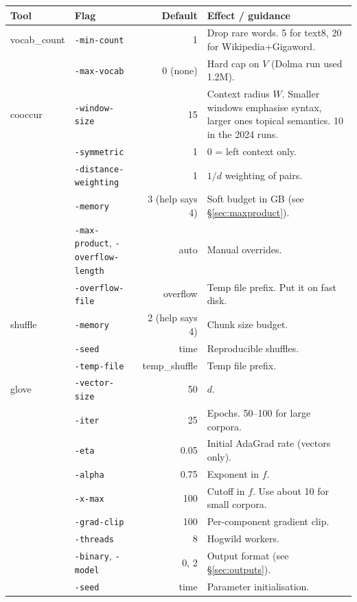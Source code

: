 \documentclass[11pt,a4paper]{article}
\newcommand{\opt}[1]{\texttt{-#1}}
\begin{document}
\begin{center}
\small
\begin{tabularx}{\linewidth}{llrX}
\toprule
Tool & Flag & Default & Effect / guidance \\
\midrule
vocab\_count & \opt{min-count} & 1 & Drop rare words. 5 for text8, 20 for Wikipedia+Gigaword. \\
             & \opt{max-vocab} & 0 (none) & Hard cap on $V$ (Dolma run used 1.2M). \\
\midrule
cooccur & \opt{window-size} & 15 & Context radius $W$. Smaller windows emphasise syntax, larger ones topical semantics. 10 in the 2024 runs. \\
        & \opt{symmetric} & 1 & 0 = left context only. \\
        & \opt{distance-weighting} & 1 & $1/d$ weighting of pairs. \\
        & \opt{memory} & 3 (help says 4) & Soft budget in GB (see \S\ref{sec:maxproduct}). \\
        & \opt{max-product}, \opt{overflow-length} & auto & Manual overrides. \\
        & \opt{overflow-file} & overflow & Temp file prefix. Put it on fast disk. \\
\midrule
shuffle & \opt{memory} & 2 (help says 4) & Chunk size budget. \\
        & \opt{seed} & time & Reproducible shuffles. \\
        & \opt{temp-file} & temp\_shuffle & Temp file prefix. \\
\midrule
glove & \opt{vector-size} & 50 & $d$. \\
      & \opt{iter} & 25 & Epochs. 50--100 for large corpora. \\
      & \opt{eta} & 0.05 & Initial AdaGrad rate (vectors only). \\
      & \opt{alpha} & 0.75 & Exponent in $f$. \\
      & \opt{x-max} & 100 & Cutoff in $f$. Use about 10 for small corpora. \\
      & \opt{grad-clip} & 100 & Per-component gradient clip. \\
      & \opt{threads} & 8 & Hogwild workers. \\
      & \opt{binary}, \opt{model} & 0, 2 & Output format (see \S\ref{sec:outputs}). \\
      & \opt{seed} & time & Parameter initialisation. \\
\bottomrule
\end{tabularx}
\end{center}
\end{document}
